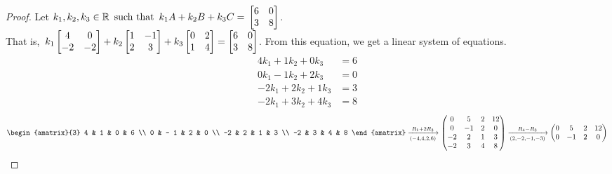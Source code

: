\begin{enumerate}
  \begin{proof}
    Let $k_1,k_2,k_3 \in \mathbb{R} \operatorname{~\text{such that}~} k_1A + k_2B + k_3C = \operatorname{\displaystyle} \begin{bmatrix} 6 & 0 \\ 3 & 8 \end{bmatrix}$. \\ That is, $\operatorname{\displaystyle} k_1\begin{bmatrix}4  & 0  \\-2 & -2\end{bmatrix} + k_2\begin{bmatrix}1 & -1 \\2 & 3\end{bmatrix} + k_3\begin{bmatrix}0 & 2 \\1 & 4\end{bmatrix} = \begin{bmatrix} 6 & 0 \\ 3 & 8 \end{bmatrix}$. From this equation, we get a linear system of equations.
    \begin{align*}
      4k_1 + 1k_2 + 0k_3  & = 6 \\
      0k_1 - 1k_2 + 2k_3  & = 0 \\
      -2k_1 + 2k_2 + 1k_3 & = 3 \\
      -2k_1 + 3k_2 + 4k_3 & = 8
    \end{align*}
    \[
      \begin{amatrix}{3}
        4 & 1 & 0 & 6 \\
        0 & - 1 & 2 & 0 \\
        -2 & 2 & 1 & 3 \\
        -2 & 3 & 4 & 8
      \end{amatrix} \xrightarrow[(-4,4,2,6)]{R_1 + 2R_3}
      \begin{pmatrix}
        0  & 5   & 2 & 12 \\
        0  & - 1 & 2 & 0  \\
        -2 & 2   & 1 & 3  \\
        -2 & 3   & 4 & 8
      \end{pmatrix} \xrightarrow[(2,-2,-1,-3)]{R_4 - R_3}
      \begin{pmatrix}
        0  & 5   & 2 & 12 \\
        0  & - 1 & 2 & 0  \\

\end{pmatrix}\]
\end{proof}
\end{enumerate}
